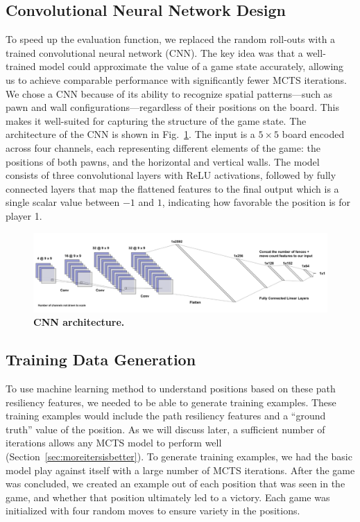 \documentclass[10pt]{article}
\begin{document}
\subsection{Convolutional Neural Network Design}
To speed up the evaluation function, we replaced the random roll-outs with a trained convolutional neural network (CNN). The key idea was that a well-trained model could approximate the value of a game state accurately, allowing us to achieve comparable performance with significantly fewer MCTS iterations. We chose a CNN because of its ability to recognize spatial patterns—such as pawn and wall configurations—regardless of their positions on the board. This makes it well-suited for capturing the structure of the game state. The architecture of the CNN is shown in Fig.~\ref{fig:cnn_arch}. The input is a $5 \times 5$ board encoded across four channels, each representing different elements of the game: the positions of both pawns, and the horizontal and vertical walls. The model consists of three convolutional layers with ReLU activations, followed by fully connected layers that map the flattened features to the final output which is a single scalar value between $-1$ and $1$, indicating how favorable the position is for player 1. 
\begin{figure}[H]
    \centering
    \includegraphics[width=\linewidth]{cnn_arch.png}
    \caption{\textbf{CNN architecture.}}
    \label{fig:cnn_arch}
\end{figure}
\subsection{Training Data Generation}

To use machine learning method to understand positions based on these path resiliency features, we needed to be able to generate training examples. These training examples would include the path resiliency features and a ``ground truth'' value of the position. As we will discuss later, a sufficient number of iterations allows any MCTS model to perform well (Section~\ref{sec:moreitersisbetter}). To generate training examples, we had the basic model play against itself with a large number of MCTS iterations. After the game was concluded, we created an example out of each position that was seen in the game, and whether that position ultimately led to a victory. Each game was initialized with four random moves to ensure variety in the positions. 
\end{document}
